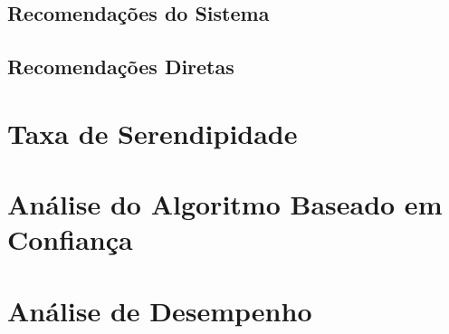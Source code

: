 \subsection{Recomendações do Sistema}

\subsection{Recomendações Diretas}


\section{Taxa de Serendipidade}
\label{sec:taxa_de_serendipidade}


\section{Análise do Algoritmo Baseado em Confiança}
\label{sec:analise_do_algoritmo_baseado_em_confianca}


\section{Análise de Desempenho}
\label{sec:analise_de_desempenho}

